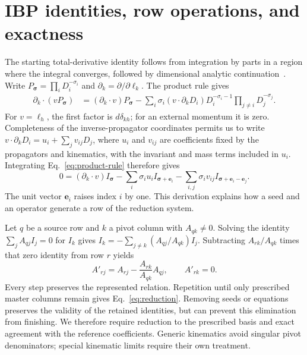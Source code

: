 \section{IBP identities, row operations, and exactness}
\label{app:derivation}
The starting total-derivative identity follows from integration by parts in a region where the integral converges, followed by dimensional analytic continuation~\cite{ChetyrkinTkachov,Weinzierl2022}. Write $P_{\boldsymbol\sigma}=\prod_iD_i^{-\sigma_i}$ and $\partial_k=\partial/\partial\ell_k$. The product rule gives
\begin{align}
 \partial_k\!\cdot(vP_{\boldsymbol\sigma})
 &=(\partial_k\!\cdot v)P_{\boldsymbol\sigma}
 -\sum_i\sigma_i(v\!\cdot\partial_kD_i)
 D_i^{-\sigma_i-1}\prod_{j\ne i}D_j^{-\sigma_j}.
 \label{eq:product-rule}
\end{align}
For $v=\ell_h$, the first factor is $d\delta_{kh}$; for an external momentum it is zero. Completeness of the inverse-propagator coordinates permits us to write $v\!\cdot\partial_kD_i=u_i+\sum_jv_{ij}D_j$, where $u_i$ and $v_{ij}$ are coefficients fixed by the propagators and kinematics, with the invariant and mass terms included in $u_i$. Integrating Eq.~\eqref{eq:product-rule} therefore gives
\begin{equation}
 0=(\partial_k\!\cdot v)I_{\boldsymbol\sigma}
 -\sum_i\sigma_i u_i I_{\boldsymbol\sigma+\boldsymbol e_i}
 -\sum_{i,j}\sigma_i v_{ij}
 I_{\boldsymbol\sigma+\boldsymbol e_i-\boldsymbol e_j}.
 \label{eq:index-shifts-new}
\end{equation}
The unit vector $\boldsymbol e_i$ raises index $i$ by one. This derivation explains how a seed and an operator generate a row of the reduction system.

Let $q$ be a source row and $k$ a pivot column with $A_{qk}\ne0$. Solving the identity $\sum_jA_{qj}I_j=0$ for $I_k$ gives $I_k=-\sum_{j\ne k}(A_{qj}/A_{qk})I_j$. Subtracting $A_{rk}/A_{qk}$ times that zero identity from row $r$ yields
\begin{equation}
 A'_{rj}=A_{rj}-\frac{A_{rk}}{A_{qk}}A_{qj},\qquad A'_{rk}=0.
 \label{eq:row-new}
\end{equation}
Every step preserves the represented relation. Repetition until only prescribed master columns remain gives Eq.~\eqref{eq:reduction}. Removing seeds or equations preserves the validity of the retained identities, but can prevent this elimination from finishing. We therefore require reduction to the prescribed basis and exact agreement with the reference coefficients. Generic kinematics avoid singular pivot denominators; special kinematic limits require their own treatment.


